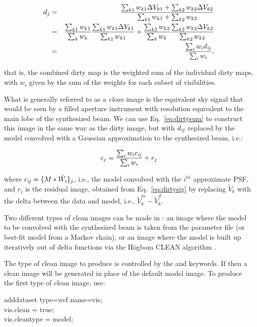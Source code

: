\begin{eqnarray}
d_j &=& {{\sum_{k1}{w_{k1}\Delta V_{k1}} + \sum_{k2}{w_{k2}\Delta V_{k2}}}\over{\sum_{k1}{w_{k1}} + \sum_{k2}{w_{k2}}} }\\
    &=& {{\sum_{k1} w_{k1}}\over{\sum_k w_k}}{{\sum_{k1}{w_{k1}\Delta V_{k1}}}\over{\sum_{k1}w_{k1}}} 
+ {{\sum_{k2} w_{k2}}\over{\sum_k w_k}}{{\sum_{k2}{w_{k2}\Delta V_{k2}}}\over{\sum_{k2}w_{k2}}}\\
&=& {{\sum_{i}{w_i d_{{\it ij}}}}\over{\sum_{i}{w_i}}},
\label{eq:dirtysum}
\end{eqnarray}

that is, the combined dirty map is the weighted sum of the individual
dirty maps, with $w_i$ given by the sum of the weights for each subset
of visibilities.  

What is generally referred to as a {\it clean} image is the equivalent
sky signal that would be seen by a filled aperture instrument with
resolution equivalent to the main lobe of the synthesized beam.  We
can use Eq.~\ref{eq:dirtysum} to construct this image in the same way
as the dirty image, but with $d_{{\it ij}}$ replaced by the model convolved
with a Gaussian approximation to the synthesized beam, i.e.:

\begin{equation}
c_j = {{\sum_{i}{w_i c_{{\it ij}}}}\over{\sum_{i}{w_i}}} + r_j
\end{equation}

where $c_{{\it ij}} = \{M * \hat{W_i}\}_j$, i.e., the model convolved with the
$i^{th}$ approximate PSF, and $r_j$ is the residual image, obtained
from Eq.~\ref{eq:dirtysig} by replacing $\tilde{V}_k$ with the delta
between the data and model, i.e., $\tilde{V}^m_k - \tilde{V}^d_k$.

Two different types of clean images can be made in \climax: an image
where the model to be convolved with the synthesized beam is taken
from the parameter file (or best-fit model from a Markov chain), or an
image where the model is built up iteratively out of delta functions
via the {H{\"o}gbom} CLEAN algorithm \citep{1974A&AS...15..417H}.

The type of clean image to produce is controlled by the 
and  keywords.  If  then a clean
image will be generated in place of the default model image.  To
produce the first type of clean image, use:

\begin{myindentpar}{3cm}
adddataset type=uvf name=vis;\\
vis.clean = true;\\
vis.cleantype = model;\\
\end{myindentpar}

